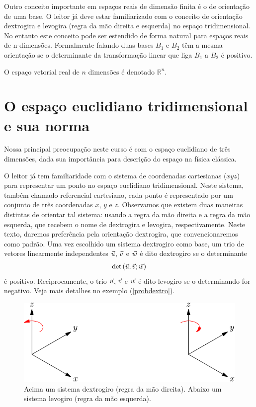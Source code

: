 Outro conceito importante em espaços reais de dimensão finita é o de orientação de uma base. O leitor já deve estar familiarizado com o conceito de orientação dextrogira e levogira (regra da mão direita e esquerda) no espaço tridimensional. No entanto este conceito pode ser estendido de forma natural para espaços reais de n-dimensões. Formalmente falando duas bases $B_1$ e $B_2$ têm a mesma orientação se o determinante da transformação linear que liga $B_1$ a $B_2$ é positivo.    

O espaço vetorial real de $n$ dimensões é denotado $\mathbb{R}^n$. 

\section{O espaço euclidiano tridimensional e sua norma}
Nossa principal preocupação neste curso é com o espaço euclidiano de três dimensões, dada sua importância para descrição do espaço na física clássica.  
 
O leitor já tem familiaridade com o sistema de coordenadas cartesianas ($xyz$) para representar um ponto no espaço euclidiano tridimensional. Neste sistema, também chamado referencial cartesiano, cada ponto é representado por um conjunto de três coordenadas $x$, $y$ e $z$. Observamos que existem duas maneiras distintas de orientar tal sistema: usando a regra da mão direita e a regra da mão esquerda, que recebem o nome de dextrogira e levogira, respectivamente. Neste texto, daremos preferência pela orientação dextrogira, que convencionaremos como padrão. Uma vez escolhido um sistema dextrogiro como base,  um trio de vetores linearmente independentes $\vec{u}$, $\vec{v}$ e  $\vec{w}$ é dito dextrogiro se o determinante 
\begin{equation}\label{defdextro}
\det\left(\vec{u};\vec{v};\vec{w}\right)
\end{equation}   
é positivo. Reciprocamente, o trio  $\vec{u}$, $\vec{v}$ e  $\vec{w}$ é dito levogiro se o determinando for negativo. Veja mais detalhes no exemplo (\ref{probdextro}).

\begin{figure}
 \includegraphics{./cap_algvet/pics/eixos_levo_destro}
      \caption{Acima um sistema dextrogiro (regra da mão direita). Abaixo um sistema levogiro (regra da mão esquerda). }
      \label{fig:marginfig}
  \end{figure}
 
